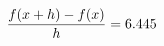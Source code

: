 \documentclass[preview]{standalone}
\begin{document}
\begin{align*}
\special{dvisvgm:raw <g id='unique000'>}\frac{f(x+h)-f(x)}{h} = 6.445\special{dvisvgm:raw </g>}
\end{align*}
\end{document}

